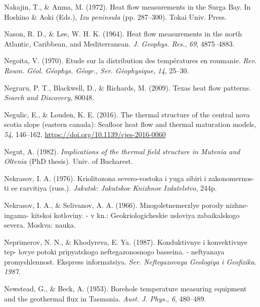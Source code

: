 \documentclass[draft,linenumbers]{agujournal2018}
\begin{document}
\leavevmode{}%
Nakajin, T., \& Anma, M. (1972). Heat flow measurements in the {Surga
Bay}. In Hoshino \& Aoki (Eds.), \emph{Izu peninsula} (pp. 287--300).
Tokai Univ. Press.

\leavevmode{}%
Nason, R. D., \& Lee, W. H. K. (1964). Heat flow measurements in the
north {Atlantic, Caribbean, and Mediterranean}. \emph{J. Geophys. Res.},
\emph{69}, 4875--4883.

\leavevmode{}%
Negoita, V. (1970). Etude sur la distribution des températures en
roumanie. \emph{Rev. Roum. Géol. Géophys. Géogr., Ser. Géophysique},
\emph{14}, 25--30.

\leavevmode{}%
Negraru, P. T., Blackwell, D., \& Richards, M. (2009). Texas heat flow
patterns. \emph{Search and Discovery}, 80048.

\leavevmode{}%
Negulic, E., \& Louden, K. E. (2016). The thermal structure of the
central nova scotia slope (eastern canada): Seafloor heat flow and
thermal maturation models, \emph{54}, 146--162.
\url{https://doi.org/10.1139/cjes-2016-0060}

\leavevmode{}%
Negut, A. (1982). \emph{Implications of the thermal field structure in
{Mutenia} and {Oltenia}} (PhD thesis). Univ. of Bucharest.

\leavevmode{}%
Nekrasov, I. A. (1976). Kriolitozona severo-vostoka i yuga sibiri i
zakonomernos- ti ee razvitiya (russ.). \emph{Jakutsk: Jakutskoe Knizhnoe
Izdatelstvo}, 244p.

\leavevmode{}%
Nekrasov, I. A., \& Selivanov, A. A. (1966). Mnogoletnemerzlye porody
nizhne-ingama- kitskoi kotloviny. - v kn.: Geokriologicheskie usloviya
zabaikalskogo severa. Moskva: nauka.

\leavevmode{}%
Neprimerov, N. N., \& Khodyreva, E. Ya. (1987). Konduktivnye i
konvektivnye tep- lovye potoki pripyatskogo neftegazonosnogo basseina. -
neftyanaya promyshlennost. Ekspress informatsiya. \emph{Ser.
Neftegazovaya Geologiya i Geofizika. 1987}.

\leavevmode{}%
Newstead, G., \& Beck, A. (1953). Borehole temperature measuring
equipment and the geothermal flux in {Tasmania}. \emph{Aust. J. Phys.},
\emph{6}, 480--489.
\end{document}
